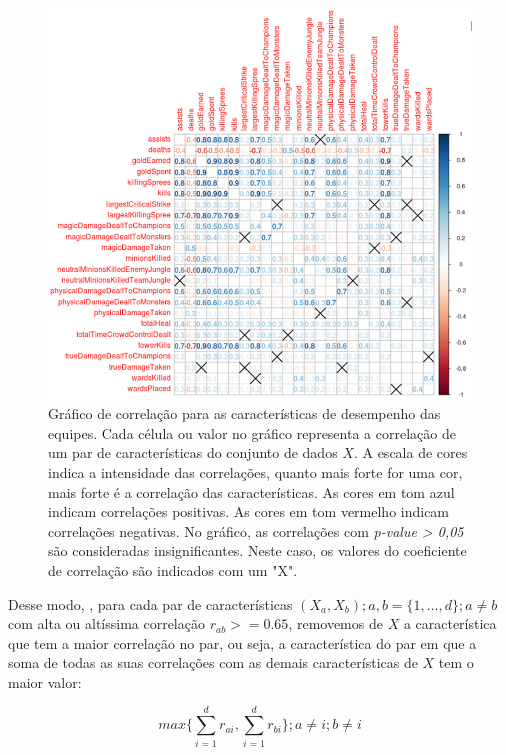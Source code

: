 \begin{figure}
  \centering
  \includegraphics[width=1.0\textwidth]{correlations}%
  \caption{Gráfico de correlação para as características de desempenho das equipes. Cada c\'elula ou valor no gr\'afico representa a correla\c{c}\~ao de um par de caracter\'isticas do conjunto de dados $X$. A escala de cores indica a intensidade das correla\c{c}\~oes, quanto mais forte for uma cor, mais forte é a correla\c{c}\~ao das caracter\'isticas. As cores em tom azul indicam correla\c{c}\~oes positivas. As cores em tom vermelho indicam correla\c{c}\~oes negativas. No gráfico, as correlações com \textit{p-value > 0,05} são consideradas insignificantes. Neste caso, os valores do coeficiente de correlação são indicados com um "X". }
  \label{fig:correlations}
\end{figure}

Desse modo, , para cada par de características $(X_a, X_b); a, b=\{1, \ldots, d\};a \neq b$ com alta ou altíssima correlação $r_{ab} >= 0.65$, removemos de $X$ a característica que tem a maior correlação no par, ou seja, a característica do par em que a soma de todas as suas correlações com as demais características de $X$ tem o maior valor:

\begin{displaymath}
  max \big\{ \sum_{i=1}^{d} r_{ai} ,  \sum_{i=1}^{d} r_{bi} \big\}; a \neq i; b \neq i
\end{displaymath}

